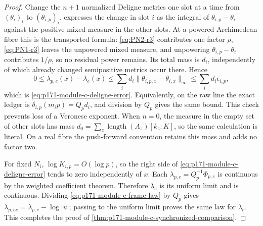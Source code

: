 \begin{proof}
Change the \(n+1\) normalized Deligne metrics one slot at a time from
\((\theta_i)_i\) to \((\theta_{i,p})_i\).
\cite[Theorem~8.16, formula~(8.9)]{BE21} expresses the change in slot \(i\)
as the integral of \(\theta_{i,p}-\theta_i\) against the positive mixed
measure in the other slots.  At a powered Archimedean fibre this is the
transported formula: \eqref{eq:PN2-r3} contributes one factor \(\rho\),
\eqref{eq:PN1-r3} leaves the unpowered mixed measure, and unpowering
\(\theta_{i,p}-\theta_i\) contributes \(1/\rho\), so no residual power
remains.  Its total mass is \(d_i\), independently of which
already changed semipositive metrics occur there.  Hence
\[
 0\leq\lambda_{p,e}(x)-\lambda_e(x)
 \leq\sum_i d_i\lVert\theta_{i,p,x}-\theta_{i,x}\rVert_\infty
 \leq\sum_i d_i\epsilon_{i,p},
\]
which is \eqref{eq:p171-module-c-deligne-error}.  Equivalently, on the raw
line the exact ledger is
\(\delta_{i,p}(m_ip)=Q_pd_i\), and division by \(Q_p\) gives the same
bound.  This check prevents loss of a Veronese exponent.  When \(n=0\),
the measure in the empty set of other slots has mass
\(d_0=\sum_z\operatorname{length}(A_z)[k_z:K]\), so the same calculation
is literal.  On a real fibre the push-forward convention retains this
mass and adds no factor two.

For fixed \(N_i\),
\(\log K_{i,p}=O(\log p)\), so the right side of
\eqref{eq:p171-module-c-deligne-error} tends to zero independently of
\(x\).  Each \(\lambda_{p,e}=Q_p^{-1}\Phi_{p,e}\) is continuous by the
weighted coefficient theorem.  Therefore \(\lambda_e\) is its uniform
limit and is continuous.  Dividing \eqref{eq:p171-module-c-frame-law} by
\(Q_p\) gives
\(\lambda_{p,ue}=\lambda_{p,e}-\log\lvert u\rvert\); passing to the
uniform limit proves the same law for \(\lambda_e\).  This completes the
proof of \cref{thm:p171-module-c-synchronized-comparison}.
\end{proof}

